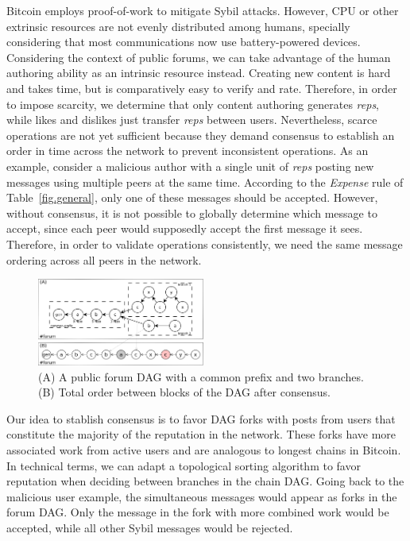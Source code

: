 \documentclass[10pt,journal,compsoc]{IEEEtran}
\newcommand{\reps}     {\emph{reps}\xspace}
\begin{document}
Bitcoin employs proof-of-work to mitigate Sybil attacks.
However, CPU or other extrinsic resources are not evenly distributed among
humans, specially considering that most communications now use
battery-powered devices.
%
Considering the context of public forums, we can take advantage of the human
authoring ability as an intrinsic resource instead.
Creating new content is hard and takes time, but is comparatively easy to
verify and rate.
Therefore, in order to impose scarcity, we determine that only content
authoring generates \reps, while likes and dislikes just transfer \reps between
users.
%
Nevertheless, scarce operations are not yet sufficient because they demand
consensus to establish an order in time across the network to prevent
inconsistent operations.
As an example, consider a malicious author with a single unit of \reps posting
new messages using multiple peers at the same time.
According to the \emph{Expense} rule of Table~\ref{fig.general}, only one of
these messages should be accepted.
However, without consensus, it is not possible to globally determine which
message to accept, since each peer would supposedly accept the first message it
sees.
Therefore, in order to validate operations consistently, we need the same
message ordering across all peers in the network.

\begin{figure}
\centering
\includegraphics[width=0.49\textwidth]{reps2.png}
\caption{
    (A) A public forum DAG with a common prefix and two branches.
    (B) Total order between blocks of the DAG after consensus.
}
\label{fig.reps}
\end{figure}

Our idea to stablish consensus is to favor DAG forks with posts from users that
constitute the majority of the reputation in the network.
These forks have more associated work from active users and are analogous to
longest chains in Bitcoin.
In technical terms, we can adapt a topological sorting algorithm to favor
reputation when deciding between branches in the chain DAG.
%
Going back to the malicious user example, the simultaneous messages would
appear as forks in the forum DAG.
Only the message in the fork with more combined work would be accepted, while
all other Sybil messages would be rejected.
\end{document}
